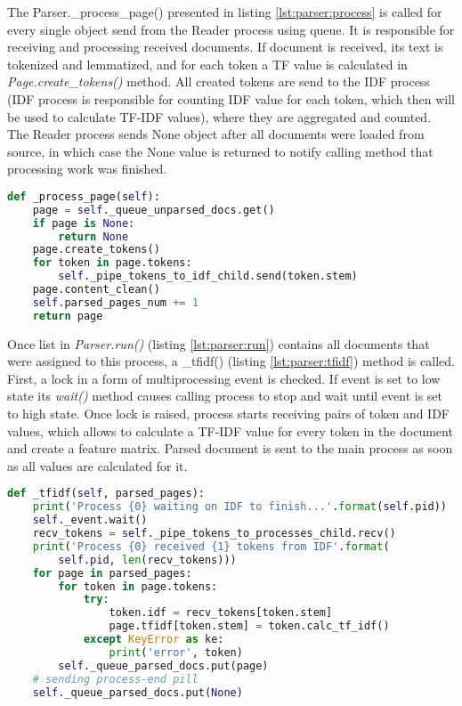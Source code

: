 The Parser.\_process\_page() presented in listing \ref{lst:parser:process} is called for every single object send from the Reader process using queue. It is responsible for receiving and processing received documents. If document is received, its text is tokenized and lemmatized, and for each token a TF value is calculated in \textit{Page.create\_tokens()} method. All created tokens are send to the IDF process (IDF process is responsible for counting IDF value for each token, which then will be used to calculate TF-IDF values), where they are aggregated and counted. The Reader process sends None object after all documents were loaded from source, in which case the None value is returned to notify calling method that processing work was finished.

\begin{lstlisting}[language=Python, caption={Parser.\_process\_page() - Processing of unparsed document}, label={lst:parser:process}]
def _process_page(self):
    page = self._queue_unparsed_docs.get()
    if page is None:
        return None
    page.create_tokens()
    for token in page.tokens:
        self._pipe_tokens_to_idf_child.send(token.stem)
    page.content_clean()
    self.parsed_pages_num += 1
    return page
\end{lstlisting}

Once list in \textit{Parser.run()} (listing \ref{lst:parser:run}) contains all documents that were assigned to this process, a \_tfidf() (listing \ref{lst:parser:tfidf}) method is called. First, a lock in a form of multiprocessing event is checked. If event is set to low state its \textit{wait()} method causes calling process to stop and wait until event is set to high state. Once lock is raised, process starts receiving pairs of token and IDF values, which allows to calculate a TF-IDF value for every token in the document and create a feature matrix. Parsed document is sent to the main process as soon as all values are calculated for it.

\begin{lstlisting}[language=Python, caption={Parser.\_tfidf() - calculating TD-IDF values for tokens in documents}, label={lst:parser:tfidf}]
def _tfidf(self, parsed_pages):
    print('Process {0} waiting on IDF to finish...'.format(self.pid))
    self._event.wait()
    recv_tokens = self._pipe_tokens_to_processes_child.recv()
    print('Process {0} received {1} tokens from IDF'.format(
        self.pid, len(recv_tokens)))
    for page in parsed_pages:
        for token in page.tokens:
            try:
                token.idf = recv_tokens[token.stem]
                page.tfidf[token.stem] = token.calc_tf_idf()
            except KeyError as ke:
                print('error', token)
        self._queue_parsed_docs.put(page)
    # sending process-end pill
    self._queue_parsed_docs.put(None)
\end{lstlisting}


